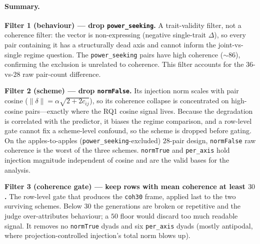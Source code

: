 \paragraph{Summary.}
\textbf{Filter 1 (behaviour) --- drop \texttt{power\_seeking}.} A trait-validity
filter, not a coherence filter: the vector is non-expressing (negative
single-trait $\Delta$), so every pair containing it has a structurally dead axis
and cannot inform the joint-vs-single regime question. The
\texttt{power\_seeking} pairs have high coherence (${\sim}86$), confirming the
exclusion is unrelated to coherence. This filter accounts for the $36$-vs-$28$
raw pair-count difference.

\textbf{Filter 2 (scheme) --- drop \texttt{normFalse}.} Its injection norm scales
with pair cosine ($\lVert\delta\rVert=\alpha\sqrt{2+2c_{ij}}$), so its coherence
collapse is concentrated on high-cosine pairs---exactly where the RQ1 cosine
signal lives. Because the degradation is correlated with the predictor, it
biases the regime comparison, and a row-level gate cannot fix a scheme-level
confound, so the scheme is dropped before gating. On the apples-to-apples
(\texttt{power\_seeking}-excluded) $28$-pair design, \texttt{normFalse} raw
coherence is the worst of the three schemes. \texttt{normTrue} and
\texttt{per\_axis} hold injection magnitude independent of cosine and are the
valid bases for the analysis.

\textbf{Filter 3 (coherence gate) --- keep rows with mean coherence at least
$30$.} The row-level gate that produces the \texttt{coh30} frame, applied last to
the two surviving schemes. Below $30$ the generations are broken or repetitive
and the judge over-attributes behaviour; a $50$ floor would discard too much
readable signal. It removes no \texttt{normTrue} dyads and six \texttt{per\_axis}
dyads (mostly antipodal, where projection-controlled injection's total norm blows
up).
